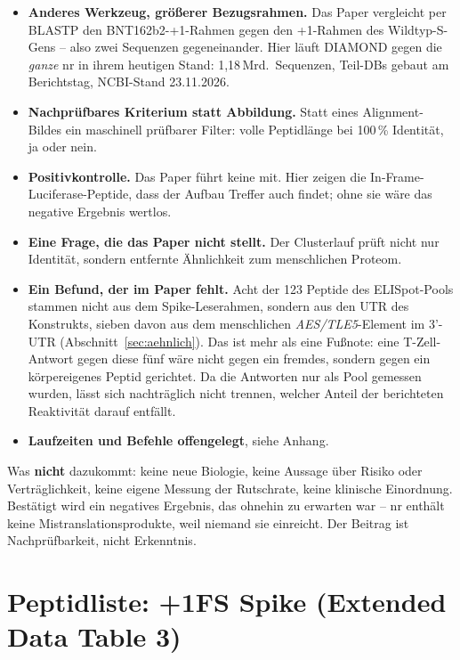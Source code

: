 \documentclass[11pt,a4paper]{article}
\begin{document}
\begin{itemize}
\item \textbf{Anderes Werkzeug, größerer Bezugsrahmen.} Das Paper vergleicht
      per BLASTP den BNT162b2-+1-Rahmen gegen den +1-Rahmen des Wildtyp-S-Gens
      -- also zwei Sequenzen gegeneinander. Hier läuft DIAMOND gegen die
      \emph{ganze} nr in ihrem heutigen Stand: 1,18\,Mrd.\ Sequenzen,
      Teil-DBs gebaut am Berichtstag, NCBI-Stand 23.11.2026.
\item \textbf{Nachprüfbares Kriterium statt Abbildung.} Statt eines
      Alignment-Bildes ein maschinell prüfbarer Filter: volle Peptidlänge bei
      100\,\% Identität, ja oder nein.
\item \textbf{Positivkontrolle.} Das Paper führt keine mit. Hier zeigen die
      In-Frame-Luciferase-Peptide, dass der Aufbau Treffer auch findet; ohne
      sie wäre das negative Ergebnis wertlos.
\item \textbf{Eine Frage, die das Paper nicht stellt.} Der Clusterlauf prüft
      nicht nur Identität, sondern entfernte Ähnlichkeit zum menschlichen
      Proteom.
\item \textbf{Ein Befund, der im Paper fehlt.} Acht der 123 Peptide des
      ELISpot-Pools stammen nicht aus dem Spike-Leserahmen, sondern aus den
      UTR des Konstrukts, sieben davon aus dem menschlichen
      \emph{AES/TLE5}-Element im 3'-UTR (Abschnitt~\ref{sec:aehnlich}). Das
      ist mehr als eine Fußnote: eine T-Zell-Antwort gegen diese fünf wäre
      nicht gegen ein fremdes, sondern gegen ein körpereigenes Peptid
      gerichtet. Da die Antworten nur als Pool gemessen wurden, lässt sich
      nachträglich nicht trennen, welcher Anteil der berichteten Reaktivität
      darauf entfällt.
\item \textbf{Laufzeiten und Befehle offengelegt}, siehe Anhang.
\end{itemize}

Was \textbf{nicht} dazukommt: keine neue Biologie, keine Aussage über Risiko
oder Verträglichkeit, keine eigene Messung der Rutschrate, keine klinische
Einordnung. Bestätigt wird ein negatives Ergebnis, das ohnehin zu erwarten war
-- nr enthält keine Mistranslationsprodukte, weil niemand sie einreicht. Der
Beitrag ist Nachprüfbarkeit, nicht Erkenntnis.

\section{Peptidliste: +1FS Spike (Extended Data Table 3)}
\end{document}

